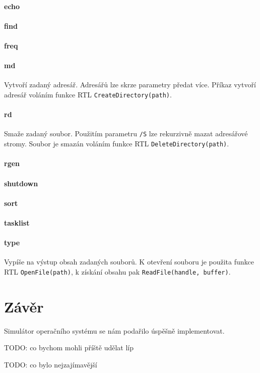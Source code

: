 \documentclass[11pt,a4paper]{scrartcl}
\begin{document}
	\paragraph{echo}
	
	\paragraph{find}
	
	\paragraph{freq}
	
	\paragraph{md}
	Vytvoří zadaný adresář. Adresářů lze skrze parametry předat více. Příkaz vytvoří adresář voláním funkce RTL \verb|CreateDirectory(path)|.
	
	\paragraph{rd}
	Smaže zadaný soubor. Použitím parametru \verb|/S| lze rekurzivně mazat adresářové stromy. Soubor je smazán voláním funkce RTL \verb|DeleteDirectory(path)|.
	
	\paragraph{rgen}
	
	\paragraph{shutdown}
	
	\paragraph{sort}
	
	\paragraph{tasklist}
	
	\paragraph{type}
	Vypíše na výstup obsah zadaných souborů. K otevření souboru je použita funkce RTL \verb|OpenFile(path)|, k získání obsahu pak \verb|ReadFile(handle, buffer)|.
	
	\section{Závěr}
	Simulátor operačního systému se nám podařilo úspěšně implementovat. 
	
	TODO: co bychom mohli příště udělat líp 
	
	TODO: co bylo nejzajímavější
	
\end{document}
